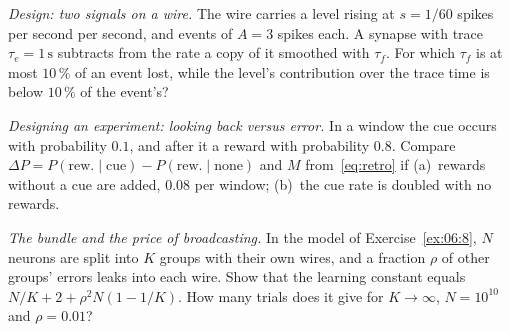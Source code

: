 \begin{exercise}[\lvlB]
\label{ex:07:6}
\emph{Design: two signals on a wire.} The  wire carries a level rising at $s=1/60$ spikes per second per second, and events of $A=3$ spikes each. A synapse with trace $\tau_e=1\,\text{s}$ subtracts from the rate a copy of it smoothed with $\tau_f$. For which $\tau_f$ is at most $10\,\%$ of an event lost, while the level's contribution over the trace time is below $10\,\%$ of the event's?
\end{exercise}

\begin{exercise}[\lvlB]
\label{ex:07:7}
\emph{Designing an experiment: looking back versus error.} In a window the cue occurs with probability $0.1$, and after it a reward with probability $0.8$. Compare $\Delta P=P(\text{rew.}\mid\text{cue})-P(\text{rew.}\mid\text{none})$ and $M$ from~\eqref{eq:retro} if (a)~rewards without a cue are added, $0.08$ per window; (b)~the cue rate is doubled with no rewards.
\end{exercise}

\begin{exercise}[\lvlC]
\label{ex:07:8}
\emph{The bundle and the price of broadcasting.} In the model of Exercise~\ref{ex:06:8}, $N$ neurons are split into $K$ groups with their own wires, and a fraction $\rho$ of other groups' errors leaks into each wire. Show that the learning constant equals $N/K+2+\rho^2N(1-1/K)$. How many trials does it give for $K\to\infty$, $N=10^{10}$ and $\rho=0.01$?
\end{exercise}
